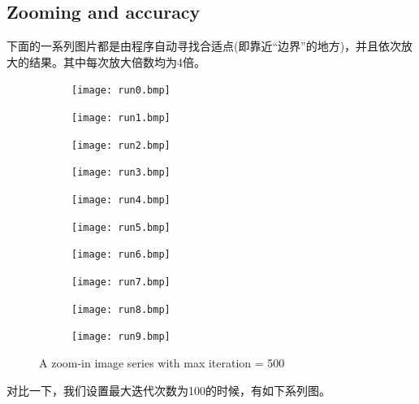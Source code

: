\documentclass{ctexart}
\begin{document}
\subsection{Zooming and accuracy}
下面的一系列图片都是由程序自动寻找合适点(即靠近“边界”的地方)，并且依次放大的结果。其中每次放大倍数均为4倍。
\begin{figure}[H]
\begin{subfigure}{0.16\textwidth}
	\centering
	\texttt{[image: run0.bmp]}
\end{subfigure}
\begin{subfigure}{0.16\textwidth}
	\centering
	\texttt{[image: run1.bmp]}
\end{subfigure}
\begin{subfigure}{0.16\textwidth}
	\centering
	\texttt{[image: run2.bmp]}
\end{subfigure}
\begin{subfigure}{0.16\textwidth}
	\centering
	\texttt{[image: run3.bmp]}
\end{subfigure}
\begin{subfigure}{0.16\textwidth}
	\centering
	\texttt{[image: run4.bmp]}
\end{subfigure}
\begin{subfigure}{0.16\textwidth}
	\centering
	\texttt{[image: run5.bmp]}
\end{subfigure}
\begin{subfigure}{0.16\textwidth}
	\centering
	\texttt{[image: run6.bmp]}
\end{subfigure}
\begin{subfigure}{0.16\textwidth}
	\centering
	\texttt{[image: run7.bmp]}
\end{subfigure}
\begin{subfigure}{0.16\textwidth}
	\centering
	\texttt{[image: run8.bmp]}
\end{subfigure}
\begin{subfigure}{0.16\textwidth}
	\centering
	\texttt{[image: run9.bmp]}
\end{subfigure}
\caption{A zoom-in image series with max iteration = 500}

\end{figure}
对比一下，我们设置最大迭代次数为100的时候，有如下系列图。
\end{document}
